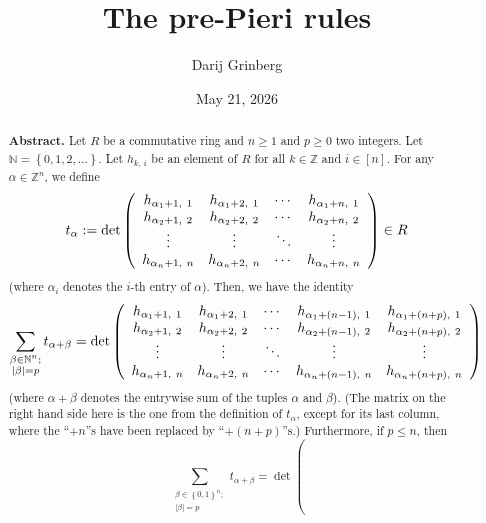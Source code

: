 \documentclass[numbers=enddot,12pt,final,onecolumn,notitlepage,english]{scrartcl}%
\theoremstyle{definition}
\let\sumnonlimits\sum
\renewcommand{\sum}{\sumnonlimits\limits}
\begin{document}
\title{The pre-Pieri rules}
\author{Darij Grinberg}
\date{May 21, 2026}
\maketitle

\begin{abstract}
\textbf{Abstract.} Let $R$ be a commutative ring and $n\geq1$ and $p\geq0$ two
integers. Let $\mathbb{N}=\left\{  0,1,2,\ldots\right\}  $. Let $h_{k,\ i}$ be
an element of $R$ for all $k\in\mathbb{Z}$ and $i\in\left[  n\right]  $. For
any $\alpha\in\mathbb{Z}^{n}$, we define%
\[
t_{\alpha}:=\det\left(
\begin{array}
[c]{cccc}%
h_{\alpha_{1}+1,\ 1} & h_{\alpha_{1}+2,\ 1} & \cdots & h_{\alpha_{1}+n,\ 1}\\
h_{\alpha_{2}+1,\ 2} & h_{\alpha_{2}+2,\ 2} & \cdots & h_{\alpha_{2}+n,\ 2}\\
\vdots & \vdots & \ddots & \vdots\\
h_{\alpha_{n}+1,\ n} & h_{\alpha_{n}+2,\ n} & \cdots & h_{\alpha_{n}+n,\ n}%
\end{array}
\right)  \in R
\]
(where $\alpha_{i}$ denotes the $i$-th entry of $\alpha$). Then, we have the
identity%
\[
\sum_{\substack{\beta\in\mathbb{N}^{n};\\\left\vert \beta\right\vert
=p}}t_{\alpha+\beta}=\det\left(
\begin{array}
[c]{ccccc}%
h_{\alpha_{1}+1,\ 1} & h_{\alpha_{1}+2,\ 1} & \cdots & h_{\alpha_{1}+\left(
n-1\right)  ,\ 1} & h_{\alpha_{1}+\left(  n+p\right)  ,\ 1}\\
h_{\alpha_{2}+1,\ 2} & h_{\alpha_{2}+2,\ 2} & \cdots & h_{\alpha_{2}+\left(
n-1\right)  ,\ 2} & h_{\alpha_{2}+\left(  n+p\right)  ,\ 2}\\
\vdots & \vdots & \ddots & \vdots & \vdots\\
h_{\alpha_{n}+1,\ n} & h_{\alpha_{n}+2,\ n} & \cdots & h_{\alpha_{n}+\left(
n-1\right)  ,\ n} & h_{\alpha_{n}+\left(  n+p\right)  ,\ n}%
\end{array}
\right)
\]
(where $\alpha+\beta$ denotes the entrywise sum of the tuples $\alpha$ and
$\beta$). (The matrix on the right hand side here is the one from the
definition of $t_{\alpha}$, except for its last column, where the
\textquotedblleft$+n$\textquotedblright s have been replaced by
\textquotedblleft$+\left(  n+p\right)  $\textquotedblright s.) Furthermore, if
$p\leq n$, then
\[
\sum_{\substack{\beta\in\left\{  0,1\right\}  ^{n};\\\left\vert \beta
\right\vert =p}}t_{\alpha+\beta}=\det\left(
\]
\end{abstract}
\end{document}
